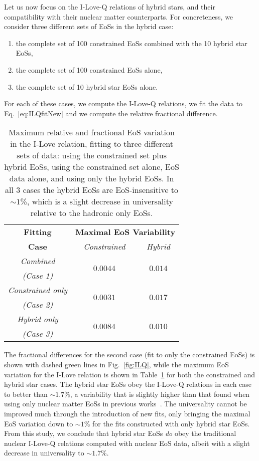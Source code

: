 \documentclass[prd,twocolumn,nofootinbib,superscriptaddress,amsmath,amssymb]{revtex4-1}
\begin{document}
Let us now focus on the I-Love-Q relations of hybrid stars, and their compatibility with their nuclear matter counterparts. For concreteness, we consider three different sets of EoSs in the hybrid case:
\begin{enumerate}
\item the complete set of 100 constrained EoSs combined with the 10 hybrid star EoSs,
\item the complete set of 100 constrained EoSs alone,
\item the complete set of 10 hybrid star EoSs alone.
\end{enumerate}
For each of these cases, we compute the I-Love-Q relations, we fit the data to Eq.~\eqref{eq:ILQfitNew} and we compute the relative fractional difference. 

\begin{table}[htb]
\centering
\begin{tabular}{ c  || c c } 
 \hline
 \hline
 \textbf{Fitting} & \multicolumn{2}{c}{\textbf{Maximal EoS Variability}} \\
 \cline{2-3}
 \textbf{Case} &  \multicolumn{1}{c|}{\emph{Constrained}} & \emph{Hybrid}\\
 \hline
 \emph{Combined} &  \multirow{2}{*}{$0.0044$} & \multirow{2}{*}{$0.014$}\\
 \emph{(Case 1)} & &\\
 \cline{1-1}
 \emph{Constrained only} & \multirow{2}{*}{$0.0031$} & \multirow{2}{*}{$0.017$}\\
  \emph{(Case 2)} & &\\
  \cline{1-1}
 \emph{Hybrid only} & \multirow{2}{*}{$0.0084$} & \multirow{2}{*}{$0.010$}\\
  \emph{(Case 3)} & &\\
  \cline{1-1}
\hline
\hline
\end{tabular}
\caption{
Maximum relative and fractional EoS variation in the I-Love relation, fitting to three different sets of data: using the constrained set plus hybrid EoSs, using the constrained set alone, EoS data alone, and using only the hybrid EoSs. In all 3 cases the hybrid EoSs are EoS-insensitive to $\sim1$\%, which is a slight decrease in universality relative to the hadronic only EoSs.
}\label{tab:hybridCompare}
\end{table}

The fractional differences for the second case (fit to only the constrained EoSs) is shown with dashed green lines in Fig.~\ref{fig:ILQ}, while the maximum EoS variation for the I-Love relation is shown in Table~\ref{tab:hybridCompare} for both the constrained and hybrid star cases. The hybrid star EoSs obey the I-Love-Q relations in each case to better than $\sim1.7$\%, a variability that is slightly higher than that found when using only nuclear matter EoSs in previous works~\cite{Yagi:ILQ}. The universality cannot be improved much through the introduction of new fits, only bringing the maximal EoS variation down to $\sim1$\% for the fits constructed with only hybrid star EoSs. From this study, we conclude that hybrid star EoSs \emph{do} obey the traditional nuclear I-Love-Q relations computed with nuclear EoS data, albeit with a slight decrease in universality to $\sim1.7$\%.  
\end{document}
